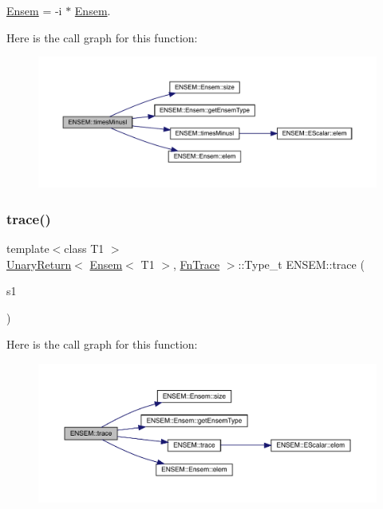 \mbox{\hyperlink{classENSEM_1_1Ensem}{Ensem}} = -\/i $\ast$ \mbox{\hyperlink{classENSEM_1_1Ensem}{Ensem}}. 

Here is the call graph for this function\+:\nopagebreak
\begin{figure}[H]
\begin{center}
\leavevmode
\includegraphics[width=350pt]{d1/d9e/group__eensem_ga405bf45509ebc2aed7e0bc4423e24849_cgraph}
\end{center}
\end{figure}
\mbox{\label{group__eensem_ga11991a607d48e08d8be636503c1f5d20}} 
\subsubsection{\texorpdfstring{trace()}{trace()}}
{\footnotesize\ttfamily template$<$class T1 $>$ \\
\mbox{\hyperlink{structENSEM_1_1UnaryReturn}{Unary\+Return}}$<$ \mbox{\hyperlink{classENSEM_1_1Ensem}{Ensem}}$<$ T1 $>$, \mbox{\hyperlink{structENSEM_1_1FnTrace}{Fn\+Trace}} $>$\+::Type\+\_\+t E\+N\+S\+E\+M\+::trace (\begin{DoxyParamCaption}\item[{const \mbox{\hyperlink{classENSEM_1_1Ensem}{Ensem}}$<$ T1 $>$ \&}]{s1 }\end{DoxyParamCaption})\hspace{0.3cm}{\ttfamily [inline]}}

Here is the call graph for this function\+:\nopagebreak
\begin{figure}[H]
\begin{center}
\leavevmode
\includegraphics[width=350pt]{d1/d9e/group__eensem_ga11991a607d48e08d8be636503c1f5d20_cgraph}
\end{center}
\end{figure}
\mbox{\label{group__eensem_ga26802b2d0529b6b46a86cf2a04647476}} 
